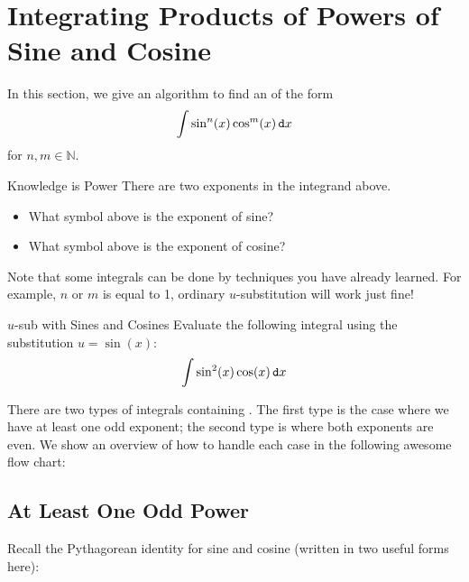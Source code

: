 

\section{Integrating Products of Powers of Sine and Cosine}

In this section, we give an algorithm to find an  of the form $$\int \sin^n(x)\cos^m(x) \mathop{}\!\mathtt{d} x$$
for $n,m\in \mathbb{N}$.

\begin{exercise}{Knowledge is Power \Coffeecup}
There are two exponents in the integrand above. 
\begin{itemize}
\item What symbol above is the exponent of sine?  
\item What symbol above is the exponent of cosine?  
\end{itemize}
\end{exercise}

Note that some  integrals can be done by techniques you have already learned.  For example, $n$ or $m$ is equal to 1, ordinary $u$-substitution will work just fine!

\begin{exercise}{$u$-sub with Sines and Cosines \Coffeecup \Coffeecup}
Evaluate the following integral using the substitution $u=\sin(x)$:
$$\int \sin^2(x)\cos(x)\mathop{}\!\mathtt{d} x $$
\end{exercise}

There are two types of integrals containing . The first type is the case where we have at least one odd exponent; the second type is where both exponents are even.  We show an overview of how to handle each case in the following awesome flow chart:

 

\subsection{At Least One Odd Power}\label{OneOdd}
Recall the Pythagorean identity for sine and cosine (written in two useful forms here): 

